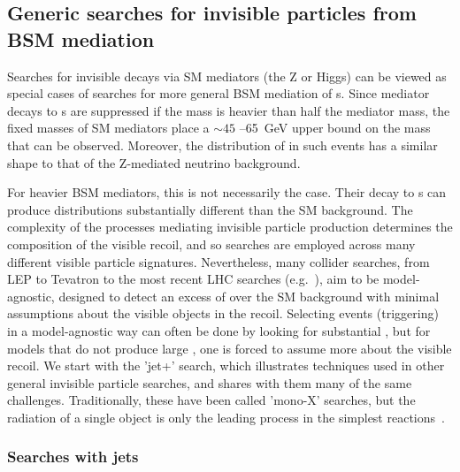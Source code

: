 \subsection{Generic searches for invisible particles from BSM mediation}
\label{sec:results_monoXSearches}

Searches for invisible decays via SM mediators (the Z or Higgs) can be viewed as special cases of searches for more general BSM mediation of {\IP}s.
Since mediator decays to {\IP}s are suppressed if the \IP mass is heavier than half the mediator mass, the fixed masses of SM mediators place a $\sim45$ --65~GeV upper bound on the \IP mass that can be observed.
Moreover, the distribution of \MET in such events has a similar shape to that of the Z-mediated neutrino background.



For heavier BSM mediators, this is not necessarily the case.
Their decay to {\IP}s can produce \MET distributions substantially different than the SM background.
The complexity of the processes mediating invisible particle production determines the composition of the visible recoil, and so searches are employed across many different visible particle signatures. 
Nevertheless, many collider searches, from LEP to Tevatron to the most recent LHC searches (e.g.~\cite{Fox:2011fx,Bai:2010hh}), %
aim to be model-agnostic, designed to detect an excess of \MET over the SM background with minimal assumptions about the visible objects in the recoil.
Selecting events (triggering) in a model-agnostic way can often be done by looking for substantial \MET, but for models that do not produce large \MET, one is forced to assume more about the visible recoil.
We start with the 'jet+\MET' search, which illustrates techniques used in other general invisible particle searches, and shares with them many of the same challenges.
Traditionally, these have been called 'mono-X' searches, but the radiation of a single object is only the leading process in the simplest reactions~\cite{Haisch:2013ata}. 

\begin{marginnote}[]
\end{marginnote}

\subsubsection{Searches with jets}

